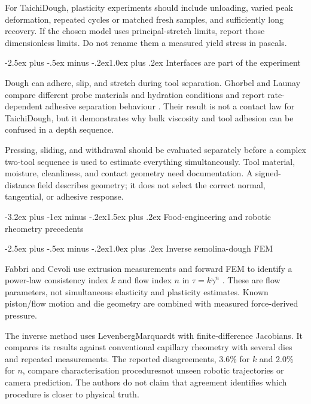 \documentclass[
  11pt,
]{article}
\makeatletter
\renewcommand\section{\needspace{7\baselineskip}\@startsection{section}{1}{\z@}%
  {-3.2ex plus -1ex minus -.2ex}{1.5ex plus .2ex}%
  {\normalfont\sffamily\Large\bfseries\color{accent}}}
\renewcommand\subsection{\needspace{5\baselineskip}\@startsection{subsection}{2}{\z@}%
  {-2.5ex plus -.5ex minus -.2ex}{1.0ex plus .2ex}%
  {\normalfont\sffamily\large\bfseries\color{accent}}}
\makeatother
\begin{document}
For TaichiDough, plasticity experiments should include unloading, varied
peak deformation, repeated cycles or matched fresh samples, and
sufficiently long recovery. If the chosen model uses principal-stretch
limits, report those dimensionless limits. Do not rename them a measured
yield stress in pascals.

\subsection{Interfaces are part of the
experiment}\label{interfaces-are-part-of-the-experiment}

Dough can adhere, slip, and stretch during tool separation. Ghorbel and
Launay compare different probe materials and hydration conditions and
report rate-dependent adhesive separation behaviour
. Their result is not a contact law
for TaichiDough, but it demonstrates why bulk viscosity and tool
adhesion can be confused in a depth sequence.

Pressing, sliding, and withdrawal should be evaluated separately before
a complex two-tool sequence is used to estimate everything
simultaneously. Tool material, moisture, cleanliness, and contact
geometry need documentation. A signed-distance field describes geometry;
it does not select the correct normal, tangential, or adhesive response.

\section{Food-engineering and robotic rheometry
precedents}\label{food-engineering-and-robotic-rheometry-precedents}

\subsection{Inverse semolina-dough
FEM}\label{inverse-semolina-dough-fem}

Fabbri and Cevoli use extrusion measurements and forward FEM to identify
a power-law consistency index \(k\) and flow index \(n\) in
\(\tau=k\dot\gamma^n\) . These are
flow parameters, not simultaneous elasticity and plasticity estimates.
Known piston/flow motion and die geometry are combined with measured
force-derived pressure.

The inverse method uses Levenberg\textendash{}\allowbreak{}Marquardt
with finite-difference Jacobians. It compares its results against
conventional capillary rheometry with several dies and repeated
measurements. The reported disagreements, 3.6\% for \(k\) and 2.0\% for
\(n\), compare characterisation procedures\textemdash{}\allowbreak{}not
unseen robotic trajectories or camera prediction. The authors do not
claim that agreement identifies which procedure is closer to physical
truth.
\end{document}
